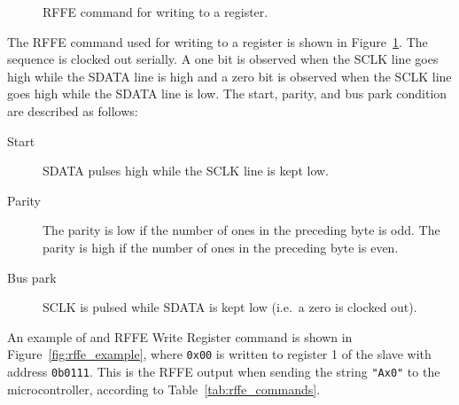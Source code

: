 \begin{figure}[htbp]
    \centering
    \caption{RFFE command for writing to a register.}
    \label{fig:rffe_write_register}
\end{figure}
The RFFE command used for writing to a register is shown in Figure~\ref{fig:rffe_write_register}. The sequence is clocked out serially. A one bit is observed when the SCLK line goes high while the SDATA line is high and a zero bit is observed when the SCLK line goes high while the SDATA line is low. The start, parity, and bus park condition are described as follows:
\begin{description}
    \item[Start] SDATA pulses high while the SCLK line is kept low.
    \item[Parity] The parity is low if the number of ones in the preceding byte is odd. The parity is high if the number of ones in the preceding byte is even.
    \item[Bus park] SCLK is pulsed while SDATA is kept low (i.e.\ a zero is clocked out).
\end{description}
An example of and RFFE Write Register command is shown in Figure~\ref{fig:rffe_example}, where \texttt{0x00} is written to register 1 of the slave with address \texttt{0b0111}. This is the RFFE output when sending the string \texttt{"Ax0"} to the microcontroller, according to Table~\ref{tab:rffe_commands}.

